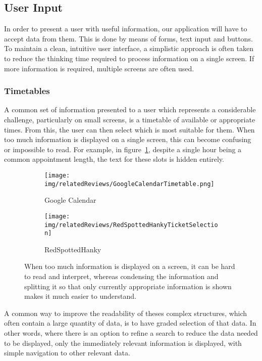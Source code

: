 \subsection{User Input}
\label{sub:user_input}

In order to present a user with useful information, our application will have
to accept data from them. This is done by means of forms, text input and
buttons. To maintain a clean, intuitive user interface, a simplistic approach
is often taken to reduce the thinking time required to process information on a
single screen. If more information is required, multiple screens are often
used.

\subsubsection{Timetables}
\label{ssub:timetables}

A common set of information presented to a user which represents a considerable
challenge, particularly on small screens, is a timetable of available or
appropriate times. From this, the user can then select which is most suitable
for them. When too much information is displayed on a single screen, this can
become confusing or impossible to read. For example, in
figure~\ref{fig:GoogleCalendarTimetable}\cite{GoogleCalendar}, despite a single
hour being a common appointment length, the text for these slots is hidden
entirely.
\begin{figure}[htbp]
	\centering
	\begin{subfigure}[b]{0.25\textwidth}
		\texttt{[image: img/relatedReviews/GoogleCalendarTimetable.png]}
		\caption{Google Calendar}\label{fig:GoogleCalendarTimetable}
	\end{subfigure}%
	\qquad
	\begin{subfigure}[b]{0.25\textwidth}
		\texttt{[image: img/relatedReviews/RedSpottedHankyTicketSelection]}
		\caption{RedSpottedHanky}\label{fig:RedSpottedHankyTicketSelection}
	\end{subfigure}
	\caption{When too much information is displayed on a screen, it can be
		hard to read and interpret, whereas condensing the information and
		splitting it so that only currently appropriate information is shown
	makes it much easier to understand. }\label{fig:timetables}
\end{figure}

A common way to improve the readability of theses complex structures, which
often contain a large quantity of data, is to have graded selection of that
data. In other words, where there is an option to refine a search to reduce the
data needed to be displayed, only the  immediately relevant information is
displayed, with simple navigation to other relevant data.

